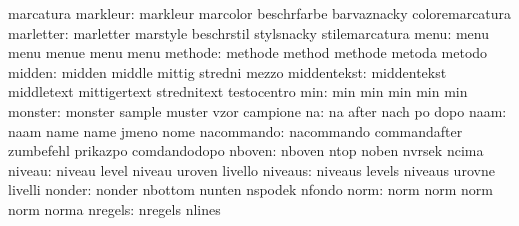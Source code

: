                            marcatura
                 markleur: markleur                  marcolor
                           beschrfarbe               barvaznacky
                           coloremarcatura
                marletter: marletter                 marstyle
                           beschrstil                stylsnacky
                           stilemarcatura
                     menu: menu                      menu
                           menue                     menu
                           menu
                  methode: methode                   method
                           methode                   metoda
                           metodo
                   midden: midden                    middle
                           mittig                    stredni
                           mezzo                     %
              middentekst: middentekst               middletext
                           mittigertext              strednitext
                           testocentro               %
                      min: min                       min
                           min                       min
                           min
                  monster: monster                   sample
                           muster                    vzor
                           campione
                       na: na                        after
                           nach                      po
                           dopo
                     naam: naam                      name
                           name                      jmeno
                           nome
               nacommando: nacommando                commandafter
                           zumbefehl                 prikazpo
                           comdandodopo
                   nboven: nboven                    ntop
                           noben                     nvrsek
                           ncima
                   niveau: niveau                    level
                           niveau                    uroven
                           livello
                  niveaus: niveaus                   levels
                           niveaus                   urovne
                           livelli
                   nonder: nonder                    nbottom
                           nunten                    nspodek
                           nfondo
                     norm: norm                      norm
                           norm                      norm
                           norma
                  nregels: nregels                   nlines
